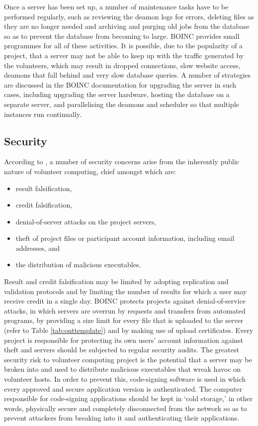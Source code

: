 Once a server has been set up, a number of maintenance tasks have to be performed regularly, such as reviewing the deamon logs for errors, deleting files as they are no longer needed and archiving  and purging old jobs from the database so as to prevent the database from becoming to large. BOINC provides small programmes for all of these activities. It is possible, due to the popularity of a project, that a server may not be able to keep up with  the traffic generated by the volunteers, which may result in dropped connections, slow website access, deamons that fall behind and very slow database queries. A number of strategies are discussed in the BOINC documentation for upgrading the server in such cases, including upgrading the server hardware,  hosting the database on a separate server, and  parallelising the deamons and scheduler so that multiple instances run continually.

\subsection{Security} \label{Bsecurity}
According to \cite{boincwiki}, a number of security concerns arise from the inherently public nature of volunteer computing, chief amongst which are:
\begin{itemize}
\item result falsification,
\item credit falsification,
\item denial-of-server attacks on the project servers, 
\item theft of project files or participant account information, including email addresses, and
\item the distribution of malicious executables.
\end{itemize}
Result and credit falsification may be limited by adopting replication and validation protocols and by limiting the number of results for which a user may receive credit  in a single day. 
BOINC protects projects against denial-of-service attacks, in which servers are overrun by requests and transfers from automated programs, by providing a size limit for every file that is uploaded to the server (refer to Table \ref{tab:outtemplate}) and by making use of upload certificates. Every project is responsible for protecting its own users' account information against theft and servers should be subjected to regular security audits.  
The greatest security risk to volunteer computing project is the potential that a server may be broken into and used to distribute malicious executables that wreak havoc on  volunteer hosts. In order to prevent this, code-signing software is used in which   every approved and secure application version is     authenticated. The computer  responsible for code-signing applications should be kept in `cold storage,' in other words, physically secure and completely disconnected from the network so as to prevent attackers from breaking into it and authenticating their applications. 

